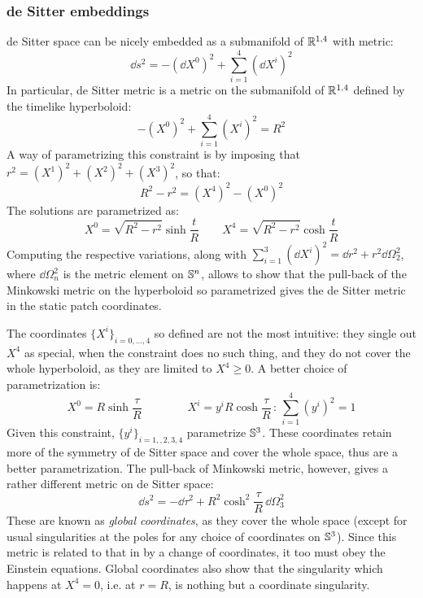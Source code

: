 \subsubsection{de Sitter embeddings}

de Sitter space can be nicely embedded as a submanifold of $ \mathbb{R}^{1,4} $ with metric:
\begin{equation}
  \dd s^2 = - (\dd X^0)^2 + \sum_{i = 1}^{4} (\dd X^i)^2
  \label{eq:dS-param-metric}
\end{equation}
In particular, de Sitter metric  is a metric on the submanifold of $ \mathbb{R}^{1,4} $ defined by the timelike hyperboloid:
\begin{equation}
  -(X^0)^2 + \sum_{i = 1}^{4} (X^i)^2 = R^2
  \label{eq:dS-param}
\end{equation}
A way of parametrizing this constraint is by imposing that $ r^2 = (X^1)^2 + (X^2)^2 + (X^3)^2 $, so that:
\begin{equation*}
  R^2 - r^2 = (X^4)^2 - (X^0)^2
\end{equation*}
The solutions are parametrized as:
\begin{equation*}
  X^0 = \sqrt{R^2 - r^2} \sinh \frac{t}{R}
  \qquad
  X^4 = \sqrt{R^2 - r^2} \cosh \frac{t}{R}
\end{equation*}
Computing the respective variations, along with $ \sum_{i = 1}^{3} (\dd X^i)^2 = \dd r^2 + r^2 \dd \Omega_2^2 $, where $ \dd \Omega_n^2 $ is the metric element on $ \mathbb{S}^{n} $, allows to show that the pull-back of the Minkowski metric  on the hyperboloid  so parametrized gives the de Sitter metric  in the static patch coordinates.

The coordinates $ \{X^i\}_{i = 0,\dots,4} $ so defined are not the most intuitive: they single out $ X^4 $ as special, when the constraint does no such thing, and they do not cover the whole hyperboloid, as they are limited to $ X^4 \ge 0 $. A better choice of parametrization is:
\begin{equation*}
  X^0 = R \sinh \frac{\tau}{R}
  \qquad \qquad
  X^i = y^i R \cosh \frac{\tau}{R}
  \,:\,
  \sum_{i = 1}^{4} (y^i)^2 = 1
\end{equation*}
Given this constraint, $ \{y^i\}_{i = 1,,2,3,4} $ parametrize $ \mathbb{S}^{3} $. These coordinates retain more of the symmetry of de Sitter space and cover the whole space, thus are a better parametrization. The pull-back of Minkowski metric, however, gives a rather different metric on de Sitter space:
\begin{equation}
  \dd s^2 = - \dd \tau^2 + R^2 \cosh^2 \frac{\tau}{R}\, \dd \Omega_3^2
  \label{eq:ds-global-coo}
\end{equation}
These are known as \textit{global coordinates}, as they cover the whole space (except for usual singularities at the poles for any choice of coordinates on $ \mathbb{S}^{3} $). Since this metric is related to that in  by a change of coordinates, it too must obey the Einstein equations. Global coordinates also show that the singularity which happens at $ X^4 = 0 $, i.e. at $ r = R $, is nothing but a coordinate singularity.

